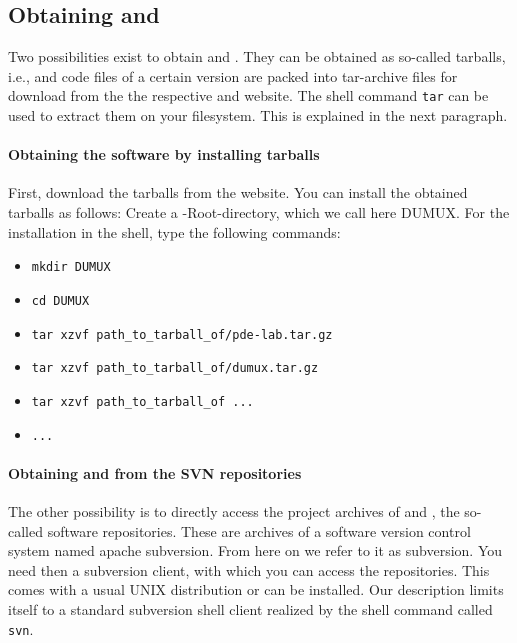\subsection{Obtaining \Dune and \Dumux}
Two possibilities exist to obtain \Dune and \Dumux. They can be obtained as so-called tarballs, i.e., \Dumux and \Dune code files of a certain version are packed into tar-archive files for download from the the respective {\Dune} and  {\Dumux} website. The shell command \texttt{tar} can be used to extract them on your filesystem. This is explained in the next paragraph. 

\paragraph{Obtaining the software by installing tarballs}
First, download the tarballs from the website. You can install the obtained tarballs as follows: Create a \Dune-Root-directory, which we call here DUMUX. For the installation in the shell, type the following commands: 
\begin{itemize}
\item \texttt{mkdir DUMUX}
\item \texttt{cd DUMUX}
\item \texttt{tar xzvf path\_to\_tarball\_of/pde-lab.tar.gz}
\item \texttt{tar xzvf path\_to\_tarball\_of/dumux.tar.gz}
\item \texttt{tar xzvf path\_to\_tarball\_of ...}
\item \texttt{...}
\end{itemize} 

\paragraph{Obtaining \Dune and \Dumux from the SVN repositories} 
The other possibility is to directly access the project archives of \Dune and \Dumux, the so-called software repositories. These are archives of a software version control system named apache subversion. From here on we refer to it as subversion.
You need then a subversion client, with which you can access the repositories. This comes with a usual UNIX distribution or can be installed. Our description limits itself to a standard subversion shell client realized by the shell command called \texttt{svn}.

